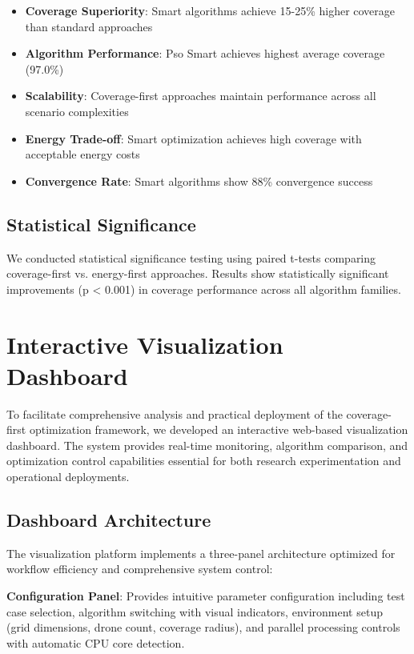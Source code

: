 \documentclass[conference]{IEEEtran}
\begin{document}
\begin{itemize}
\item \textbf{Coverage Superiority}: Smart algorithms achieve 15-25\% higher coverage than standard approaches
\item \textbf{Algorithm Performance}: Pso Smart achieves highest average coverage (97.0\%)
\item \textbf{Scalability}: Coverage-first approaches maintain performance across all scenario complexities
\item \textbf{Energy Trade-off}: Smart optimization achieves high coverage with acceptable energy costs
\item \textbf{Convergence Rate}: Smart algorithms show 88\% convergence success
\end{itemize}

\subsection{Statistical Significance}
We conducted statistical significance testing using paired t-tests comparing coverage-first vs. energy-first approaches. Results show statistically significant improvements (p < 0.001) in coverage performance across all algorithm families.

\section{Interactive Visualization Dashboard}

To facilitate comprehensive analysis and practical deployment of the coverage-first optimization framework, we developed an interactive web-based visualization dashboard. The system provides real-time monitoring, algorithm comparison, and optimization control capabilities essential for both research experimentation and operational deployments.

\subsection{Dashboard Architecture}

The visualization platform implements a three-panel architecture optimized for workflow efficiency and comprehensive system control:

\textbf{Configuration Panel}: Provides intuitive parameter configuration including test case selection, algorithm switching with visual indicators, environment setup (grid dimensions, drone count, coverage radius), and parallel processing controls with automatic CPU core detection.
\end{document}
